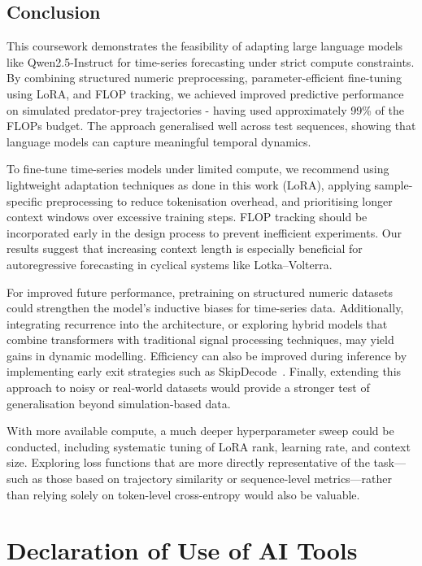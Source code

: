 \documentclass[a4paper,12pt]{article}
\begin{document}
  \subsection*{Conclusion}

  This coursework demonstrates the feasibility of adapting large language models like Qwen2.5-Instruct for time-series forecasting under strict compute constraints. By combining structured numeric preprocessing, parameter-efficient fine-tuning using LoRA, and FLOP tracking, we achieved improved predictive performance on simulated predator-prey trajectories - having used approximately 99\% of the FLOPs budget. The approach generalised well across test sequences, showing that language models can capture meaningful temporal dynamics.
  
  To fine-tune time-series models under limited compute, we recommend using lightweight adaptation techniques as done in this work (LoRA), applying sample-specific preprocessing to reduce tokenisation overhead, and prioritising longer context windows over excessive training steps. FLOP tracking should be incorporated early in the design process to prevent inefficient experiments. Our results suggest that increasing context length is especially beneficial for autoregressive forecasting in cyclical systems like Lotka–Volterra.
  
  For improved future performance, pretraining on structured numeric datasets could strengthen the model’s inductive biases for time-series data. Additionally, integrating recurrence into the architecture, or exploring hybrid models that combine transformers with traditional signal processing techniques, may yield gains in dynamic modelling. Efficiency can also be improved during inference by implementing early exit strategies such as SkipDecode~\cite{delcorro2023skipdecode}. Finally, extending this approach to noisy or real-world datasets would provide a stronger test of generalisation beyond simulation-based data.
  
  With more available compute, a much deeper hyperparameter sweep could be conducted, including systematic tuning of LoRA rank, learning rate, and context size. Exploring loss functions that are more directly representative of the task—such as those based on trajectory similarity or sequence-level metrics—rather than relying solely on token-level cross-entropy would also be valuable.





\section*{Declaration of Use of AI Tools}
\end{document}
